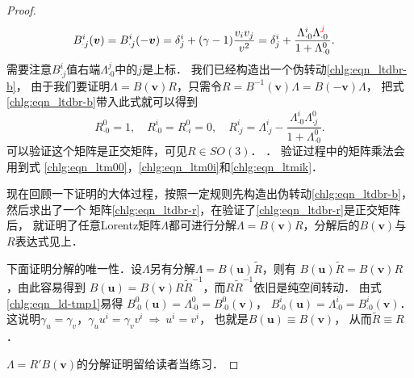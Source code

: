 \begin{proof}
\begin{equation}
\begin{aligned}
            B^{i}_{\cdot j}(\boldsymbol{v}) &= B^{i}_{\cdot j}(-\boldsymbol{v}) =
            \delta^i_j + (\gamma-1)\dfrac{v_i v_j}{v^2} =
            \delta^i_j + \dfrac{\Lambda ^{i}_{\cdot 0}\Lambda ^{{\color{red}j}}_{\cdot 0}}
            {1 + \Lambda ^{0}_{\cdot 0} } .
        \end{aligned}
    \end{equation}
    需要注意$B^{i}_{\cdot j}$值右端$\Lambda ^{j}_{\cdot 0}$中的$j$是上标．
    我们已经构造出一个伪转动\eqref{chlg:eqn_ltdbr-b}，
    由于我们要证明$\Lambda=B(\boldsymbol{v})R$，只需令$R =B^{-1}(\boldsymbol{v})\Lambda=B(-\boldsymbol{v})\Lambda $，
    把式\eqref{chlg:eqn_ltdbr-b}带入此式就可以得到
    \begin{equation}\label{chlg:eqn_ltdbr-r}
        R^{0}_{\cdot 0} = 1, \quad    R^{i}_{\cdot 0} = R^{0}_{\cdot i} = 0, \quad
        R^{i}_{\cdot j} = \Lambda^i_{\cdot j} - \dfrac{\Lambda ^{i}_{\cdot 0}
            \Lambda ^{0}_{\cdot j}}{1 + \Lambda ^{0}_{\cdot 0} }.
    \end{equation}
    可以验证这个矩阵是正交矩阵，可见$R\in SO(3)$．
    ．
    验证过程中的矩阵乘法会用到式
    \eqref{chlg:eqn_ltm00}，\eqref{chlg:eqn_ltm0i}和\eqref{chlg:eqn_ltmik}．
    
    现在回顾一下证明的大体过程，按照一定规则先构造出伪转动\eqref{chlg:eqn_ltdbr-b}，然后求出了一个
    矩阵\eqref{chlg:eqn_ltdbr-r}，在验证了\eqref{chlg:eqn_ltdbr-r}是正交矩阵后，
    就证明了任意Lorentz矩阵$\Lambda$都可进行分解$\Lambda=B(\boldsymbol{v})R$，分解后的$B(\boldsymbol{v})$与$R$表达式见上．
    
    下面证明分解的唯一性．设$\Lambda$另有分解$\Lambda={B}(\boldsymbol{u})\tilde{R}$，则有
    ${B}(\boldsymbol{u})\tilde{R}=B(\boldsymbol{v})R$，由此容易得到
    ${B}(\boldsymbol{u})=B(\boldsymbol{v})R\tilde{R}^{-1}$，而$R\tilde{R}^{-1}$依旧是纯空间转动．
    由式\eqref{chlg:eqn_ld-tmp1}易得
    ${B}^{0}_{\cdot 0}(\boldsymbol{u})= \Lambda^0_{\cdot 0}=B^{0}_{\cdot 0}(\boldsymbol{v})$，
    ${B}^{i}_{\cdot 0}(\boldsymbol{u})= {\Lambda^i_{\cdot 0}} =B^{i}_{\cdot 0}(\boldsymbol{v})$．
    这说明$\gamma_u =\gamma_v$，$\gamma_u u^i=\gamma_v v^i{\  \Rightarrow \  } u^i=v^i$，
    也就是${B}(\boldsymbol{u}) \equiv B(\boldsymbol{v})$，    从而$\tilde{R}\equiv R$．
    
    
    $\Lambda = R'B(\boldsymbol{v})$的分解证明留给读者当练习．
\end{proof}

